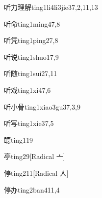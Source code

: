\begin{verbete}{听力理解}{ting1li4li3jie3}{7,2,11,13}
\end{verbete}

\begin{verbete}{听命}{ting1ming4}{7,8}
\end{verbete}

\begin{verbete}{听凭}{ting1ping2}{7,8}
\end{verbete}

\begin{verbete}{听说}{ting1shuo1}{7,9}
\end{verbete}

\begin{verbete}{听随}{ting1sui2}{7,11}
\end{verbete}

\begin{verbete}{听戏}{ting1xi4}{7,6}
\end{verbete}

\begin{verbete}{听小骨}{ting1xiao3gu3}{7,3,9}
\end{verbete}

\begin{verbete}{听写}{ting1xie3}{7,5}
\end{verbete}

\begin{verbete}{聼}{ting1}{19}
\end{verbete}

\begin{verbete}{亭}{ting2}{9}[Radical 亠]
\end{verbete}

\begin{verbete}{停}{ting2}{11}[Radical 人]
\end{verbete}

\begin{verbete}{停办}{ting2ban4}{11,4}
\end{verbete}


